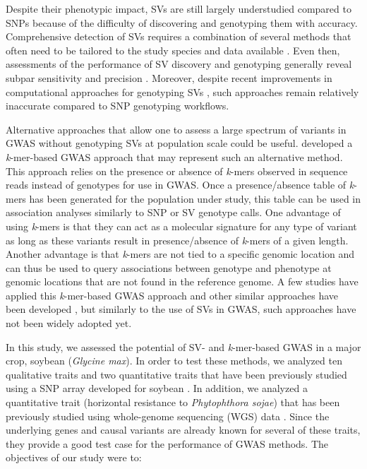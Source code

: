 Despite their phenotypic impact, SVs are still largely understudied compared to SNPs
because of the difficulty of discovering and genotyping them with
accuracy. Comprehensive detection of SVs requires a combination of several
methods that often need to be tailored to the study species and data available
\citep{alkan2011, ho2020}. Even then, assessments of the performance of SV
discovery and genotyping generally reveal subpar sensitivity and precision
\citep[e.g.][]{cameron2019, chaisson2019, kosugi2019}. Moreover, despite recent
improvements in computational approaches for genotyping SVs
\citep[e.g.][]{siren2021, ebler2022}, such approaches remain relatively inaccurate
compared to SNP genotyping workflows.

Alternative approaches that allow one to assess a large spectrum
of variants in GWAS without genotyping SVs at population scale could be useful.
\cite{voichek2020} developed a \emph{k}-mer-based GWAS approach that may
represent such an alternative method. This approach relies on the presence or
absence of \emph{k}-mers observed in sequence reads instead of genotypes for use in
GWAS. Once a presence/absence table of \emph{k}-mers has been generated for the
population under study, this table can be used in association analyses
similarly to SNP or SV genotype calls. One advantage of using \emph{k}-mers is
that they can act as a molecular signature for any type of variant as long as
these variants result in presence/absence of \emph{k}-mers of a given length.
Another advantage is that \emph{k}-mers are not tied to a specific genomic
location and can thus be used to query associations between genotype and
phenotype at genomic locations that are not found in the reference genome.  A
few studies have applied this \emph{k}-mer-based GWAS approach
\citep[e.g.][]{tripodi2021, colque2021} and other similar approaches have been
developed \citep{rahman2018, he2021}, but similarly to the use of SVs in GWAS,
such approaches have not been widely adopted yet.

In this study, we assessed the potential of SV- and \emph{k}-mer-based GWAS in
a major crop, soybean (\emph{Glycine max}).  In order to test these methods, we
analyzed ten qualitative traits \citep{bandillo2017} and two quantitative
traits \citep{bandillo2015} that have been previously studied using a SNP array
developed for soybean \citep{song2013}. In addition, we analyzed a quantitative trait
(horizontal resistance to \emph{Phytophthora sojae}) that has been previously
studied using whole-genome sequencing (WGS) data \citep{deronne2022}.
Since the underlying genes and causal variants are already known for several of
these traits, they provide a good test case for the performance of GWAS methods.
The objectives of our study were to:

